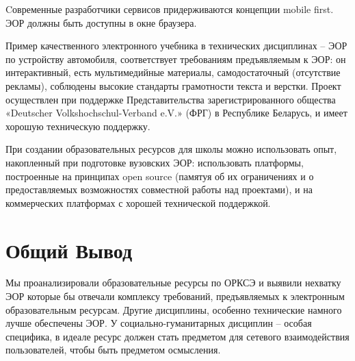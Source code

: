 Cовременные разработчики сервисов придерживаются концепции mobile first. 
ЭОР должны быть доступны в окне браузера.

Пример качественного электронного учебника в технических дисциплинах – ЭОР по устройству автомобиля\cite{automobile}, соответствует требованиям предъявляемым к ЭОР: он интерактивный, есть мультимедийные материалы, самодостаточный (отсутствие рекламы), соблюдены высокие стандарты грамотности текста и верстки. Проект осуществлен при поддержке Представительства зарегистрированного общества «Deutscher Volkshochschul-Verband e.V.» (ФРГ) в Республике Беларусь, и имеет хорошую техническую поддержку.

При создании образовательных ресурсов для школы можно использовать опыт, накопленный при подготовке вузовских ЭОР: использовать платформы, построенные на принципах open source (памятуя об их ограничениях и о предоставляемых возможностях совместной работы над проектами), и  на коммерческих платформах с хорошей технической поддержкой.



\section{Общий Вывод}
 Мы проанализировали образовательные ресурсы по ОРКСЭ и выявили нехватку ЭОР которые бы отвечали комплексу требований, предъявляемых к электронным образовательным ресурсам. Другие дисциплины, особенно технические намного лучше обеспечены ЭОР. У социально-гуманитарных дисциплин – особая специфика, в идеале ресурс должен стать предметом для сетевого взаимодействия пользователей, чтобы быть предметом осмысления.

